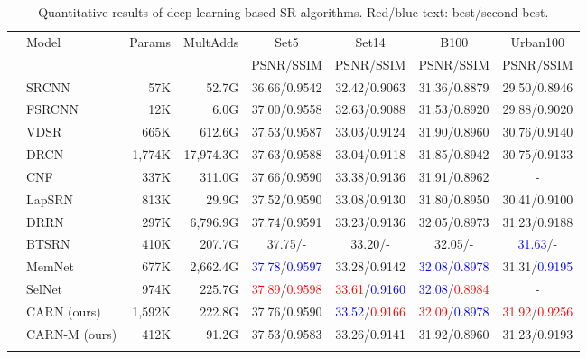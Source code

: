 \documentclass[runningheads]{llncs}
\newcommand{\blue}[1]{\textcolor{blue}{#1}}
\newcommand{\red}[1]{\textcolor{red}{#1}}
\newcommand\Tstrut{\rule{0pt}{2.5ex}}
\newcommand\Bstrut{\rule[-1ex]{0pt}{0pt}}
\def\HS{\hspace{\fontdimen2\font}}
\def\HSE{\HS\HS\HS\HS\HS\HS\HS\HS}
\begin{document}
\begin{table}[t]
\scriptsize
\setlength{\tabcolsep}{2pt}
\caption{Quantitative results of deep learning-based SR algorithms. Red/blue text: best/second-best.}
\begin{center}
\begin{tabular}{c l r r c c c c}
\hline\Tstrut
\multirow{2}{*}{Scale} & \multirow{2}{*}{Model} & \multirow{2}{*}{Params} & \multirow{2}{*}{MultAdds} & Set5 & Set14 & B100 & Urban100 \\
&  &  & & PSNR/SSIM & PSNR/SSIM & PSNR/SSIM & PSNR/SSIM
\Bstrut\\\hline\Tstrut
\multirow{12}{*}{2} & SRCNN\cite{srcnn2014}
                           & 57K    & 52.7G    & 36.66/0.9542 & 32.42/0.9063 & 31.36/0.8879 & 29.50/0.8946 \\
& FSRCNN\cite{fsrcnn2016}  & 12K    & 6.0G     & 37.00/0.9558 & 32.63/0.9088 & 31.53/0.8920 & 29.88/0.9020 \\
& VDSR\cite{vdsr2016}      & 665K   & 612.6G   & 37.53/0.9587 & 33.03/0.9124 & 31.90/0.8960 & 30.76/0.9140 \\
& DRCN\cite{drcn2016}      & 1,774K & 17,974.3G & 37.63/0.9588 & 33.04/0.9118 & 31.85/0.8942 & 30.75/0.9133 \\
& CNF\cite{cnf2017}        & 337K   & 311.0G   & 37.66/0.9590 & 33.38/0.9136 & 31.91/0.8962 & -\\
& LapSRN\cite{lapsrn2017}  & 813K   & 29.9G    & 37.52/0.9590 & 33.08/0.9130 & 31.80/0.8950 & 30.41/0.9100 \\
& DRRN\cite{drnn2017}      & 297K   & 6,796.9G & 37.74/0.9591 & 33.23/0.9136 & 32.05/0.8973 & 31.23/0.9188 \\
& BTSRN\cite{btsrn2017}    & 410K   & 207.7G   & 37.75/-\HSE  & 33.20/-\HSE  & 32.05/-\HSE  & \blue{31.63}/-\HSE \\
& MemNet\cite{memnet}      & 677K   & 2,662.4G   & \blue{37.78}/\blue{0.9597} & 33.28/0.9142 & \blue{32.08}/\blue{0.8978} & 31.31/\blue{0.9195} \\
& SelNet\cite{selnet}      & 974K   & 225.7G   & \red{37.89}/\red{0.9598}  & \red{33.61}/\blue{0.9160}  & \blue{32.08}/\red{0.8984} & - \\
& CARN (ours)              & 1,592K & 222.8G   & 37.76/0.9590 & \blue{33.52}/\red{0.9166} & \red{32.09}/\blue{0.8978}	& \red{31.92}/\red{0.9256} \\
& CARN-M (ours)            & 412K   & 91.2G    & 37.53/0.9583 & 33.26/0.9141 & 31.92/0.8960	& 31.23/0.9193\Bstrut \\\hline\Tstrut

\end{tabular}
\end{center}
\end{table}
\end{document}
